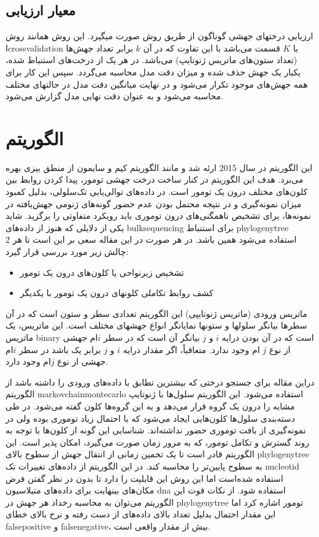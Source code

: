 \subsection{معیار ارزیابی}
ارزیابی درختهای جهشی گوناگون از طریق روش  صورت میگیرد. این روش همانند روش ا\gls{crossvalidation} با $K$ قسمت می‌باشد با این تفاوت که در آن $k$ برابر تعداد جهش‌ها (تعداد ستون‌های ماتریس ژنوتایپ) می‌باشد. در هر یک از درخت‌های استنباط شده، یکبار یک جهش حذف شده و میزان دقت مدل محاسبه می‌گردد. سپس این کار برای همه جهش‌های موجود تکرار می‌شود و در نهایت میانگین دقت مدل در حالتهای مختلف محاسبه می‌شود و به عنوان دقت نهایی مدل گزارش می‌شود.  

\section{الگوریتم  \cite{yuan2015bitphylogeny}}
این الگوریتم در سال 2015 ارئه شد و مانند الگوریتم کیم و سایمون از منطق بیزی بهره می‌برد. هدف این الگوریتم در کنار ساخت درخت جهشی تومور، پیدا کردن روابط بین کلون‌های مختلف درون یک تومور است. در داده‌های توالی‌یابی تک‌سلولی، بدلیل کمبود میزان نمونه‌گیری و در نتیجه محتمل بودن عدم حضور گونه‌های ژنومی جهش‌یافته در نمونه‌ها، برای تشخیص ناهمگنی‌های درون توموری باید رویکرد متفاوتی را برگزید. شاید یکی از دلایلی که هنوز از داده‌های \gls{bulksequencing} برای استنباط \gls{phylogenytree} استفاده می‌شود همین باشد. در هر صورت در این مقاله سعی بر این است تا هر 2 چالش زیر مورد بررسی قرار گیرد: 
\begin{itemize}
	\item  تشخیص زیرنواحی یا کلون‌های درون یک تومور 
	\item	کشف روابط تکاملی کلونهای درون یک تومور با یکدیگر 
\end{itemize}

ماتریس ورودی (ماتریس ژنوتایپی) این الگوریتم تعدادی سطر و ستون است که در آن سطرها بیانگر سلولها و ستونها نمایانگر انواع جهشهای مختلف است. این ماتریس، یک ماتریس \gls{binary} است که در آن بودن درایه $i$ و $j$ بیانگر آن است که در سطر $i$ام جهشی از نوع $j$ ام وجود ندارد. متعاقباً، اگر مقدار درایه $i$ و $j$ برابر یک باشد در سطر $i$ام جهشی از نوع $j$ام وجود دارد. 

دراین مقاله برای جستجو درختی که بیشترین تطابق با داده‌های ورودی را داشته باشد از الگوریتم \gls{markovchainmontecarlo} استفاده می‌شود. این الگوریتم سلول‌ها با ژنوتایپ مشابه را درون یک گروه قرار می‌دهد و به این گروه‌ها کلون گفته می‌شود. در طی دسته‌بندی سلول‌ها کلون‌هایی ایجاد می‌شود که با احتمال زیاد توموری بوده ولی در نمونه‌گیری از بافت توموری حضور نداشته‌اند. شناسایی این گونه از کلون‌ها با توجه به روند گسترش و تکامل تومور، که به مرور زمان صورت می‌گیرد، امکان پذیر است. این الگوریتم قادر است تا یک تخمین زمانی از انتقال جهش از سطوح بالای \gls{phylogenytree} به سطوح پایین‌تر را محاسبه کند. در این الگوریتم از داده‌های تغییرات تک \gls{nucleotid} استفاده شده‌است اما این روش این قابلیت را دارد تا بدون در نظر گفتن فرض مکان‌های بینهایت برای داده‌های متیلاسیون \gls{dna} استفاده شود. از نکات قوت این الگوریتم می‌توان  به محاسبه رخداد هر جهش در \gls{phylogenytree} تومور اشاره کرد اما این مقدار احتمال بدلیل تعداد بالای داده‌های از دست رفته و نرخ بالای خطای \gls{falsepositive} و \gls{falsenegative}، بیش از مقدار واقعی است. 

